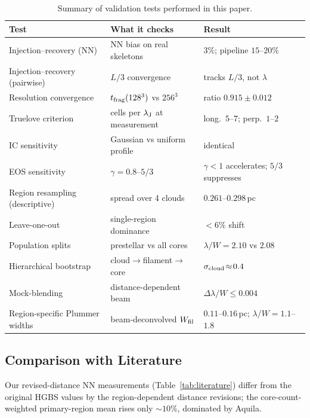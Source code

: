 \documentclass[usenatbib,twoside,twocolumn]{mnras}
\begin{document}
\begin{table}
\caption{Summary of validation tests performed in this paper.}
\label{tab:validation_summary}
\footnotesize
\setlength{\tabcolsep}{3pt}
\begin{tabular}{p{2.3cm}p{2.9cm}p{2.0cm}}
\toprule
Test & What it checks & Result \\
\midrule
Injection--recovery (NN) & NN bias on real skeletons & $3\%$; pipeline $15$--$20\%$ \\
Injection--recovery (pairwise) & $L/3$ convergence & tracks $L/3$, not $\lambda$ \\
Resolution convergence & $t_{\rm frag}(128^3)$ vs $256^3$ & ratio $0.915\pm0.012$ \\
Truelove criterion & cells per $\lambda_{\rm J}$ at measurement & long.\ $5$--$7$; perp.\ $1$--$2$ \\
IC sensitivity & Gaussian vs uniform profile & identical \\
EOS sensitivity & $\gamma=0.8$--$5/3$ & $\gamma<1$ accelerates; $5/3$ suppresses \\
Region resampling (descriptive) & spread over 4 clouds & $0.261$--$0.298$\,pc \\
Leave-one-out & single-region dominance & $<6\%$ shift \\
Population splits & prestellar vs all cores & $\lambda/W\!=\!2.10$ vs $2.08$ \\
Hierarchical bootstrap & cloud$\to$filament$\to$core & $\sigma_{\rm cloud}\!\approx\!0.4$ \\
Mock-blending & distance-dependent beam & $\Delta\lambda/W\!\le\!0.004$ \\
Region-specific Plummer widths & beam-deconvolved $W_{\rm fil}$ & $0.11$--$0.16$\,pc; $\lambda/W\!=\!1.1$--$1.8$ \\
\bottomrule
\end{tabular}
\end{table}

\subsection{Comparison with Literature}

Our revised-distance NN measurements (Table~\ref{tab:literature}) differ from the original HGBS values by the region-dependent distance revisions; the core-count-weighted primary-region mean rises only $\sim10\%$, dominated by Aquila.
\end{document}
